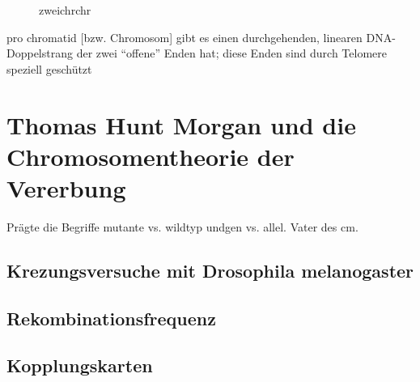 


\begin{figure}[H]
    \caption{\gls{zweichrchr}}\label{fig:figure}
\end{figure}

pro \gls{chromatid} [bzw. Chromosom] gibt es einen durchgehenden, linearen DNA-Doppelstrang
der zwei ``offene'' Enden hat; diese Enden sind durch Telomere speziell geschützt



\section{Thomas Hunt Morgan und die Chromosomentheorie der Vererbung}\label{sec:thomas-hunt-morgan-und-die-chromosomentheorie-der-vererbung}
Prägte die Begriffe \gls{mutante} vs. \gls{wildtyp}  und\gls{gen} vs. \gls{allel}.
Vater des \gls{cm}. %

\subsection{Krezungsversuche mit Drosophila melanogaster}\label{subsec:krezungsversuche-mit-drosophila-melanogaster}



\subsection{Rekombinationsfrequenz}\label{subsec:rekombinationsfrequenz}

\subsection{Kopplungskarten}\label{subsec:kopplungskarten}

